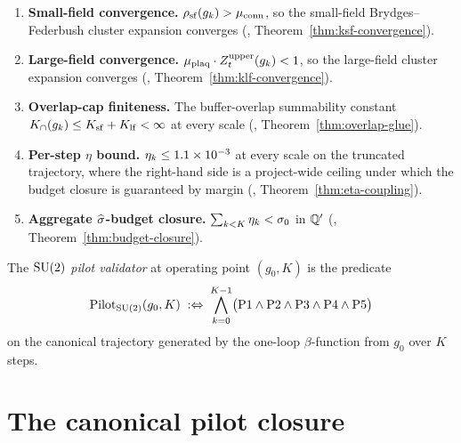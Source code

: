 \begin{enumerate}[label=(P\arabic*)]
  \item \textbf{Small-field convergence.}
    $\rho_{\mathrm{sf}}(g_k) > \mu_{\mathrm{conn}}$, so the small-field
    Brydges--Federbush cluster expansion converges
    (,
    Theorem~\ref{thm:ksf-convergence}).
  \item \textbf{Large-field convergence.}
    $\mu_{\mathrm{plaq}} \cdot Z_t^{\mathrm{upper}}(g_k) < 1$, so the
    large-field cluster expansion converges
    (,
    Theorem~\ref{thm:klf-convergence}).
  \item \textbf{Overlap-cap finiteness.}
    The buffer-overlap summability constant
    $K_{\cap}(g_k) \le K_{\mathrm{sf}} + K_{\mathrm{lf}} < \infty$ at every scale
    (, Theorem~\ref{thm:overlap-glue}).
  \item \textbf{Per-step $\eta$ bound.}
    $\eta_k \le 1.1 \times 10^{-3}$ at every scale on the
    truncated trajectory, where the right-hand side is a
    project-wide ceiling under which the budget closure is
    guaranteed by margin (,
    Theorem~\ref{thm:eta-coupling}).
  \item \textbf{Aggregate $\widehat{\sigma}$-budget closure.}
    $\sum_{k < K} \eta_k < \sigma_0$ in $\mathbb{Q}'$
    (,
    Theorem~\ref{thm:budget-closure}).
\end{enumerate}

\begin{definition}
\label{def:pilot-validator}
The \emph{$\mathrm{SU}(2)$ pilot validator} at operating point
$(g_0, K)$ is the predicate
\begin{equation}
  \label{eq:validator-predicate}
  \mathrm{Pilot}_{\mathrm{SU}(2)}(g_0, K)
  \;:\Leftrightarrow\;
  \bigwedge_{k = 0}^{K - 1}
    \bigl(\mathrm{P1} \wedge \mathrm{P2} \wedge \mathrm{P3} \wedge \mathrm{P4} \wedge \mathrm{P5}\bigr)
\end{equation}
on the canonical trajectory generated by the one-loop
$\beta$-function from $g_0$ over $K$ steps.
\end{definition}

\section{The canonical pilot closure}
\label{sec:canonical-pilot-closure}

%

